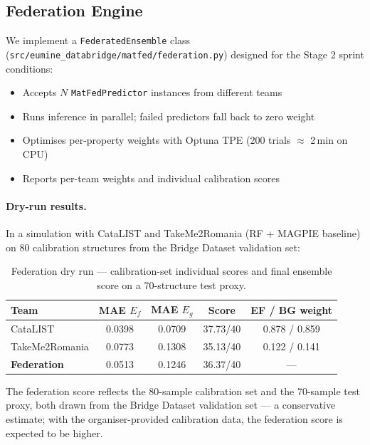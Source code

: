 \documentclass[10pt, a4paper]{article}
\begin{document}
\subsection{Federation Engine}

We implement a \texttt{FederatedEnsemble} class
(\texttt{src/eumine\_databridge/matfed/federation.py}) designed for
the Stage 2 sprint conditions:

\begin{itemize}[nosep]
  \item Accepts $N$ \texttt{MatFedPredictor} instances from different teams
  \item Runs inference in parallel; failed predictors fall back to zero
    weight
  \item Optimises per-property weights with Optuna TPE
    (200 trials $\approx$ 2\,min on CPU)
  \item Reports per-team weights and individual calibration scores
\end{itemize}

\paragraph{Dry-run results.}
In a simulation with CataLIST and TakeMe2Romania (RF + MAGPIE baseline)
on 80 calibration structures from the Bridge Dataset validation set:

\begin{table}[h!]
\centering
\caption{Federation dry run — calibration-set individual scores and
  final ensemble score on a 70-structure test proxy.}
\label{tab:federation}
\begin{tabular}{@{}lcccc@{}}
\toprule
Team & MAE $E_f$ & MAE $E_g$ & Score & EF / BG weight \\
\midrule
CataLIST       & 0.0398 & 0.0709 & 37.73/40 & 0.878 / 0.859 \\
TakeMe2Romania & 0.0773 & 0.1308 & 35.13/40 & 0.122 / 0.141 \\
\midrule
\textbf{Federation} & 0.0513 & 0.1246 & 36.37/40 & — \\
\bottomrule
\end{tabular}
\end{table}

The federation score reflects the 80-sample calibration set and the
70-sample test proxy, both drawn from the Bridge Dataset validation set —
a conservative estimate; with the organiser-provided calibration data,
the federation score is expected to be higher.
\end{document}
